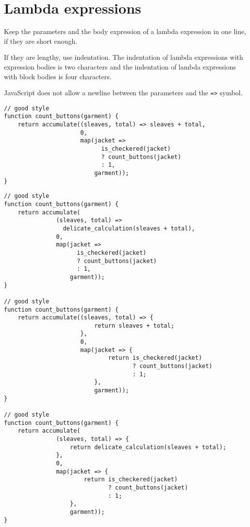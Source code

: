 \vspace{-4mm}

\section*{Lambda expressions}

Keep the parameters and the body expression of a lambda expression
in one line, if they are short enough.

If they are lengthy, use
indentation. The indentation of lambda expressions with expression bodies is
two characters and the indentation of lambda expressions with block bodies is
four characters.

JavaScript does not allow a newline between the parameters and the \lstinline{=>}
symbol.
\newpage

\begin{lstlisting}
// good style
function count_buttons(garment) {
    return accumulate((sleaves, total) => sleaves + total,
                      0, 
                      map(jacket =>
                            is_checkered(jacket)
                            ? count_buttons(jacket)
                            : 1,
                          garment));
}
\end{lstlisting}
\begin{lstlisting}
// good style
function count_buttons(garment) {
    return accumulate(
               (sleaves, total) =>
                 delicate_calculation(sleaves + total),
               0,
               map(jacket =>
                     is_checkered(jacket)
                     ? count_buttons(jacket)
                     : 1,
                   garment));
}

// good style
function count_buttons(garment) {
    return accumulate((sleaves, total) => {
                          return sleaves + total;
                      },
                      0, 
                      map(jacket => {
                              return is_checkered(jacket)
                                     ? count_buttons(jacket)
                                     : 1;
                          },
                          garment));
}

// good style
function count_buttons(garment) {
    return accumulate(
               (sleaves, total) => {
                   return delicate_calculation(sleaves + total);
               },
               0,
               map(jacket => {
                       return is_checkered(jacket)
                              ? count_buttons(jacket)
                              : 1;
                   },
                   garment));
}
\end{lstlisting}
